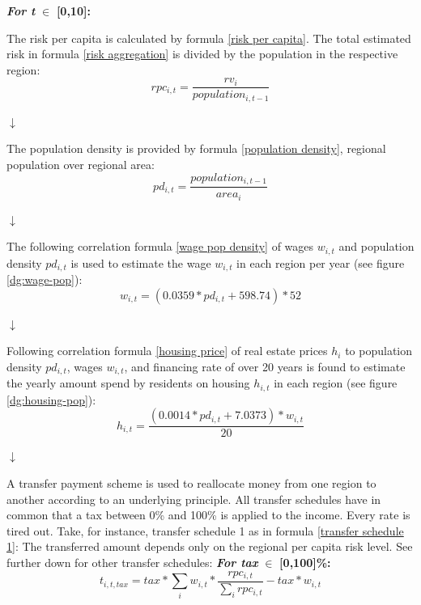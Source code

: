 \documentclass[10pt,a4paper]{article}
\begin{document}
\begin{center}
\textbf{\textit{For t }}$\in$ \textbf{[0,10]:}\vspace{.5cm}


The risk per capita is calculated by formula \ref{risk per capita}. The total estimated risk in formula \ref{risk aggregation} is divided by the population in the respective region:
\begin{equation}
    rpc_{i,t} = \frac{rv_{i}}{population_{i,t-1}}
    \label{risk per capita}
\end{equation}

\begin{center}
    $\downarrow$
\end{center}
The population density is provided by formula \ref{population density}, regional population over regional area:
\begin{equation}
    pd_{i,t} = \frac{population_{i,t-1}}{area_i}
    \label{population density}
\end{equation}

\begin{center}
    $\downarrow$
\end{center}
The following correlation formula \ref{wage pop density} of wages $w_{i,t}$ and population density $pd_{i,t}$ is used to estimate the wage $w_{i,t}$ in each region per year (see figure \ref{dg:wage-pop}):
\begin{equation}
    w_{i,t} = (0.0359*pd_{i,t}+598.74) * 52
    \label{wage pop density}
\end{equation}

\begin{center}
    $\downarrow$
\end{center}
Following correlation formula \ref{housing price} of real estate prices $h_i$ to population density $pd_{i,t}$, wages $w_{i,t}$, and financing rate of over 20 years is found to estimate the yearly amount spend by residents on housing $h_{i,t}$ in each region (see figure \ref{dg:housing-pop}):
\begin{equation}
    h_{i,t} = \frac{(0.0014*pd_{i,t}+7.0373) * w_{i,t}}{20}
    \label{housing price}
\end{equation}

\begin{center}
    $\downarrow$
\end{center}
A transfer payment scheme is used to reallocate money from one region to another according to an underlying principle. All transfer schedules have in common that a tax between 0\% and 100\% is applied to the income. Every rate is tired out. Take, for instance, transfer schedule 1 as in formula \ref{transfer schedule 1}: The transferred amount depends only on the regional per capita risk level. See further down for other transfer schedules:
\newline
\newline
\textbf{\textit{For tax }}$\in$ \textbf{[0,100]\%:}\vspace{.5cm}
\begin{equation}
    t_{i,t,tax} = tax * \sum_i w_{i,t} * \frac{rpc_{i,t}}{\sum_i rpc_{i,t}} - tax * w_{i,t}
    \label{transfer schedule 1}
\end{equation}


\end{center}
\end{document}
